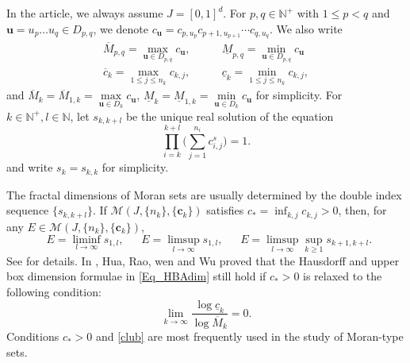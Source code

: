 \documentclass[12pt]{amsart}
\numberwithin{equation}{section}
\theoremstyle{plain}
\theoremstyle{remark}
\theoremstyle{definition}
\newcommand{\om}{\overline{M}}
\newcommand{\um}{\underline{M}}
\newcommand{\N}{\mathbb{N}}
\newcommand{\bu}{\mathbf{u}}
\newcommand{\ccc}{\mathbf{c}}
\newcommand{\oc}{\overline{c}}
\newcommand{\uc}{\underline{c}}
\renewcommand{\ge}{\geqslant}
\renewcommand{\le}{\leqslant}
\DeclareMathOperator{\dimh}{dim_H}
\DeclareMathOperator{\odimb}{\overline{dim}_B}
\DeclareMathOperator{\dima}{dim_A}
\begin{document}
	In the article, we always assume  $J=[0,1]^d$. For $p,q\in \N^+$ with $1\le p< q$ and $\bu=u_p\ldots u_{q}\in D_{p,q}$,  we denote $c_\bu=c_{p,u_p}c_{p+1,u_{p+1}}\cdots c_{q,u_{q}}$. We also write
	\[ \begin{split}
		\om_{p,q}=\max_{\bu\in D_{p,q}}c_{\bu},\quad & \quad \um_{p,q}=\min_{\bu\in D_{p,q}}c_{\bu}   \\ \oc_k=\max_{1\le j\le n_k}c_{k,j},\quad &\quad \uc_k=\min_{1\le j\le n_k}c_{k,j}, 
	\end{split}	\]
	and $
	\om_k =\om_{1,k}=\max\limits_{\bu \in D_k}c_{\bu}$, $  \um_k = \um_{1,k}=\min\limits_{\bu \in D_k}c_{\bu} $ for simplicity.	
	For $k\in \N^+,l\in \N $, let $s_{k,k+l}$  be the unique real solution of the equation
	\begin{equation} \label{def_skl}
		\prod_{i=k}^{k+l}\Big(\sum_{j=1}^{n_i}c_{i,j}^s \Big)=1.
	\end{equation}
	and write $s_k = s_{k,k}$ for simplicity.  

The fractal dimensions of  Moran sets are usually determined by the double index sequence $\{s_{k,k+l}\}$.   If  $\mathcal{M}(J,\{n_k\},\{\ccc_k\})$ satisfies  $c_*=\inf_{k,j}c_{k,j}>0$,  then, for any  $E\in\mathcal{M}(J,\{n_k\},\{\ccc_k\})$,
	\begin{equation}\label{Eq_HBAdim}
		\dimh E=\liminf_{l\to\infty} s_{1,l},\quad \odimb E=\limsup_{l\to\infty} s_{1,l}, \quad  \dima E=\limsup_{l\to\infty}\sup_{k\ge 1} s_{k+1,k+l} .
	\end{equation}
	See  \cite{li2016assouad} for details.  
	In \cite{hua2000structures}, Hua, Rao, wen and Wu proved that   the Hausdorff  and upper box dimension formulae in \eqref{Eq_HBAdim} still hold if $c_*>0$ is relaxed to the following condition:
	\begin{equation}\label{club}
		\lim_{k\to\infty}\frac{\log \uc_k}{\log \om_k}=0.
	\end{equation}
Conditions $c_*>0$ and \eqref{club} are most frequently used in the study of Moran-type sets. 
\end{document}
